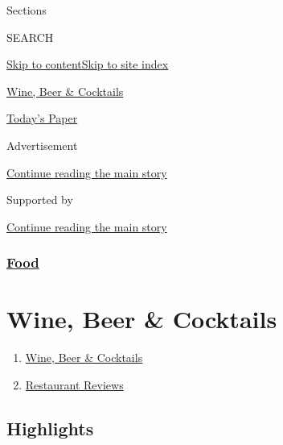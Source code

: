 Sections

SEARCH

\protect\hyperlink{site-content}{Skip to
content}\protect\hyperlink{site-index}{Skip to site index}

\href{https://www.nytimes.com/section/food/drinks}{Wine, Beer \&
Cocktails}

\href{https://myaccount.nytimes.com/auth/login?response_type=cookie\&client_id=vi}{}

\href{https://www.nytimes.com/section/todayspaper}{Today's Paper}

Advertisement

\protect\hyperlink{after-top}{Continue reading the main story}

Supported by

\protect\hyperlink{after-sponsor}{Continue reading the main story}

\hypertarget{food}{%
\subsubsection{\texorpdfstring{\href{/section/food}{Food}}{Food}}\label{food}}

\hypertarget{wine-beer--cocktails}{%
\section{Wine, Beer \& Cocktails}\label{wine-beer--cocktails}}

\begin{enumerate}
\def\labelenumi{\arabic{enumi}.}
\tightlist
\item
  \href{/section/food/drinks}{Wine, Beer \& Cocktails}
\item
  \href{/reviews/dining}{Restaurant Reviews}
\end{enumerate}

\hypertarget{highlights}{%
\subsection{Highlights}\label{highlights}}

